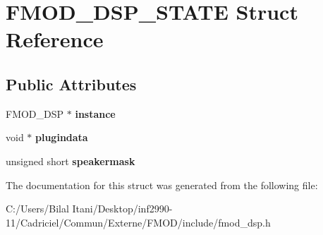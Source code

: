 \hypertarget{struct_f_m_o_d___d_s_p___s_t_a_t_e}{}\section{F\+M\+O\+D\+\_\+\+D\+S\+P\+\_\+\+S\+T\+A\+TE Struct Reference}
\label{struct_f_m_o_d___d_s_p___s_t_a_t_e}
\subsection*{Public Attributes}
\begin{DoxyCompactItemize}
\item 
F\+M\+O\+D\+\_\+\+D\+SP $\ast$ {\bfseries instance}\hypertarget{struct_f_m_o_d___d_s_p___s_t_a_t_e_a1756ea7b18fdd566e64c64de4151a39c}{}\label{struct_f_m_o_d___d_s_p___s_t_a_t_e_a1756ea7b18fdd566e64c64de4151a39c}

\item 
void $\ast$ {\bfseries plugindata}\hypertarget{struct_f_m_o_d___d_s_p___s_t_a_t_e_a94293193f1fd65ffc7d72de31e03932c}{}\label{struct_f_m_o_d___d_s_p___s_t_a_t_e_a94293193f1fd65ffc7d72de31e03932c}

\item 
unsigned short {\bfseries speakermask}\hypertarget{struct_f_m_o_d___d_s_p___s_t_a_t_e_a98c7cf116176d358e3d26193245f6e19}{}\label{struct_f_m_o_d___d_s_p___s_t_a_t_e_a98c7cf116176d358e3d26193245f6e19}

\end{DoxyCompactItemize}


The documentation for this struct was generated from the following file\+:\begin{DoxyCompactItemize}
\item 
C\+:/\+Users/\+Bilal Itani/\+Desktop/inf2990-\/11/\+Cadriciel/\+Commun/\+Externe/\+F\+M\+O\+D/include/fmod\+\_\+dsp.\+h\end{DoxyCompactItemize}
